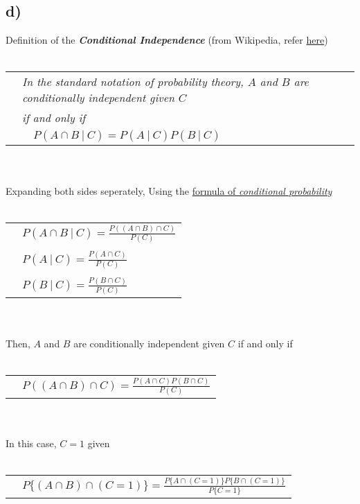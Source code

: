 \documentclass[12pt]{article}
\begin{document}
\subsection*{d)}
Definition of the \textit{\textbf{Conditional Independence}} (from Wikipedia, refer \href{https://en.wikipedia.org/wiki/Conditional_independence#Definition}{here})
\\ \\
\begin{tabular}{l l}
    & \textit{In the standard notation of probability theory, $A$ and $B$ are conditionally independent given $C$}\\
    & \textit{ if and only if }\\
    &$\quad P(A \cap B\ |\ C) = P(A\ |\ C)P(B\ |\ C)$\\
\end{tabular}
\\ \\
Expanding both sides seperately, Using the \hyperlink{cond}{formula of \textit{conditional probability}}
\\ \\
\begin{tabular}{l l}
    &$P(A \cap B\ |\ C)= \frac{P((A \cap B) \cap C)}{P(C)}$\\
    &\\
    &$P(A\ |\ C)= \frac{P(A \cap C)}{P(C)}$\\
    &\\
    &$P(B\ |\ C)= \frac{P(B \cap C)}{P(C)}$\\
\end{tabular}
\\ \\
Then, $A$ and $B$ are conditionally independent given $C$ if and only if
\\ \\
\begin{tabular}{l l}
    &$P((A \cap B) \cap C)=\frac{P(A \cap C)P(B \cap C)}{P(C)}$\\
\end{tabular}
\\ \\
In this case, $C=1$ given
\\ \\
\begin{tabular}{l l}
    &$P\{(A \cap B) \cap (C=1)\}=\frac{P\{A \cap (C=1)\}P\{B \cap (C=1)\}}{P\{C=1\}}$\\
\end{tabular}
\\ \\
\end{document}
